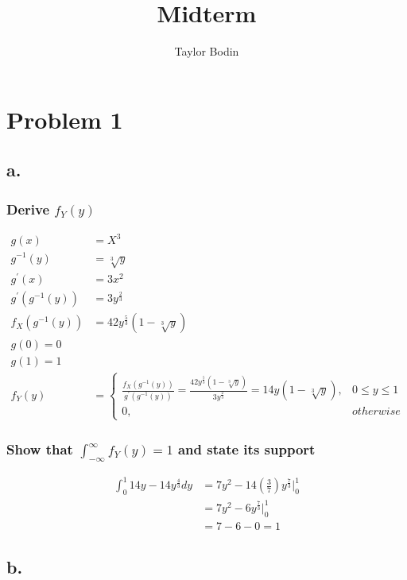 \documentclass[12pt]{article}
\begin{document}
\title{Midterm}
\author{Taylor Bodin}
\maketitle

\section*{Problem 1}

\subsection*{a.}

\subsubsection*{Derive $f_Y(y)$ }
\begin{align*}
  g(x) &= X^3 \\
  g^{-1}(y) &= \sqrt[3]{y} \\
  g^{'}(x) &= 3x^2 \\
  g^{'}(g^{-1}(y)) &= 3y^{\frac{2}{3}} \\
  f_X(g^{-1}(y)) &= 42y^{\frac{5}{3}}(1-\sqrt[3]{y}) \\
  g(0) = 0 \\
  g(1) = 1 \\
  f_Y(y) &= 
  \begin{cases}
    \frac{f_X(g^{-1}(y))}{g^{'}(g^{-1}(y))} 
    = \frac{42y^{\frac{5}{3}}(1-\sqrt[3]{y})}{3y^{\frac{2}{3}}}
    = 14y(1-\sqrt[3]{y}), & 0 \leq y \leq 1 \\
    0, & otherwise
  \end{cases}
\end{align*}

\subsubsection*{Show that $\int_{-\infty}^\infty f_Y(y) = 1$ and state its support}
\begin{align*}
  \int_0^1 14y-14y^\frac{4}{3}dy 
  &= 7y^2 - 14\left(\frac{3}{7}\right)y^{\frac{7}{3}}\big|_0^1 \\
  &= 7y^2 - 6y^{\frac{7}{3}}\big|_0^1 \\
  &= 7 - 6 - 0 = 1
\end{align*}

\subsection*{b.}
\end{document}
